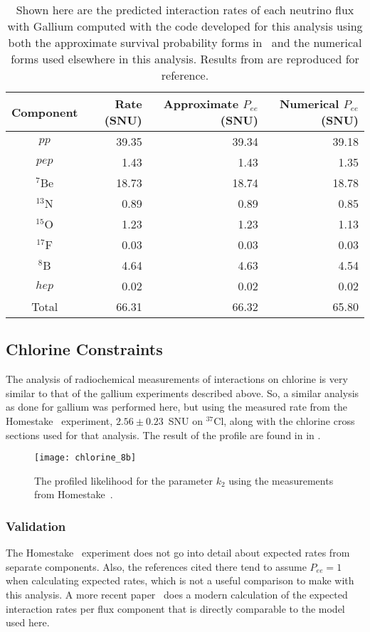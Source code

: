 \begin{table}
\centering
\begin{tabular}{c|r|r|r}
Component & \cite{sagecombo} Rate (SNU) & Approximate $P_{ee}$ (SNU) & Numerical $P_{ee}$ (SNU) \\ \hline
$pp$		& 39.35	&	39.34 	&	39.18	\\
$pep$		& 1.43 	&	1.43 	&	1.35 	\\ 
$^7$Be		& 18.73	&	18.74	& 	18.78	\\
$^{13}$N	& 0.89 	&	0.89	&	0.85	\\ 
$^{15}$O	& 1.23 	&	1.23	&	1.13	\\ 
$^{17}$F	& 0.03 	&	0.03	&	0.03	\\
$^8$B		& 4.64 	&	4.63	&	4.54	\\ 
$hep$		& 0.02 	&	0.02	&	0.02	\\ \hline
Total		& 66.31	&	66.32 	&	65.80	\\ \hline
\end{tabular}
\caption{\label{tbl:gallium}Shown here are the predicted interaction rates of each neutrino flux with Gallium computed with the code developed for this analysis using both the approximate survival probability forms in~\cite{sagecombo} and the numerical forms used elsewhere in this analysis. Results from \cite{sagecombo} are reproduced for reference.}
\end{table}

\subsection{Chlorine Constraints}

The analysis of radiochemical measurements of interactions on chlorine is very similar to that of the gallium experiments described above. 
So, a similar analysis as done for gallium was performed here, but using the measured rate from the Homestake~\cite{homestake} experiment, $2.56\pm0.23$~SNU on $^{37}$Cl, along with the chlorine cross sections used for that analysis.
The result of the profile are found in in .

\begin{figure}
\centering
\texttt{[image: chlorine\_8b]}
\caption{The profiled likelihood for the parameter $k_2$ using the measurements from Homestake~\cite{homestake}.}
\label{fig:cl_profiles}
\end{figure}


\subsubsection{Validation}
The Homestake~\cite{homestake} experiment does not go into detail about expected rates from separate components.
Also, the references cited there tend to assume $P_{ee} = 1$ when calculating expected rates, which is not a useful comparison to make with this analysis.
A more recent paper~\cite{bachall_lma} does a modern calculation of the expected interaction rates per flux component that is directly comparable to the model used here.

